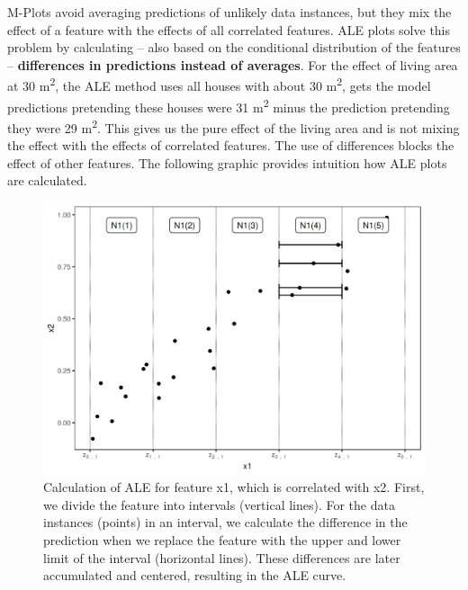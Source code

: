 \documentclass[12pt,]{krantz}
\begin{document}
M-Plots avoid averaging predictions of unlikely data instances, but they
mix the effect of a feature with the effects of all correlated features.
ALE plots solve this problem by calculating -- also based on the
conditional distribution of the features -- \textbf{differences in
predictions instead of averages}. For the effect of living area at 30
m\textsuperscript{2}, the ALE method uses all houses with about 30
m\textsuperscript{2}, gets the model predictions pretending these houses
were 31 m\textsuperscript{2} minus the prediction pretending they were
29 m\textsuperscript{2}. This gives us the pure effect of the living
area and is not mixing the effect with the effects of correlated
features. The use of differences blocks the effect of other features.
The following graphic provides intuition how ALE plots are calculated.

\begin{figure}

{\centering \includegraphics[width=\textwidth]{images/aleplot-computation-1} 

}

\caption{Calculation of ALE for feature x1, which is correlated with x2. First, we divide the feature into intervals (vertical lines). For the data instances (points) in an interval, we calculate the difference in the prediction when we replace the feature with the upper and lower limit of the interval (horizontal lines). These differences are later accumulated and centered, resulting in the ALE curve.}\label{fig:aleplot-computation}
\end{figure}
\end{document}
